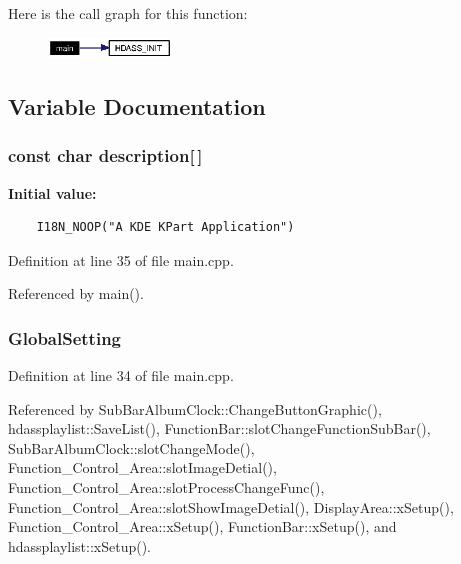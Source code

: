 Here is the call graph for this function:\begin{figure}[H]
\begin{center}
\leavevmode
\includegraphics[width=93pt]{main_8cpp_a6_cgraph}
\end{center}
\end{figure}


\subsection{Variable Documentation}
\subsubsection{\setlength{\rightskip}{0pt plus 5cm}const char {\bf description}[$\,$]\hspace{0.3cm}{\tt  [static]}}\label{main_8cpp_a2}


{\bf Initial value:}

\footnotesize\begin{verbatim}
    I18N_NOOP("A KDE KPart Application")
\end{verbatim}\normalsize 


Definition at line 35 of file main.cpp.

Referenced by main().
\subsubsection{ {\bf Global\-Setting}}\label{main_8cpp_a1}




Definition at line 34 of file main.cpp.

Referenced by Sub\-Bar\-Album\-Clock::Change\-Button\-Graphic(), hdassplaylist::Save\-List(), Function\-Bar::slot\-Change\-Function\-Sub\-Bar(), Sub\-Bar\-Album\-Clock::slot\-Change\-Mode(), Function\_\-Control\_\-Area::slot\-Image\-Detial(), Function\_\-Control\_\-Area::slot\-Process\-Change\-Func(), Function\_\-Control\_\-Area::slot\-Show\-Image\-Detial(), Display\-Area::x\-Setup(), Function\_\-Control\_\-Area::x\-Setup(), Function\-Bar::x\-Setup(), and hdassplaylist::x\-Setup().

